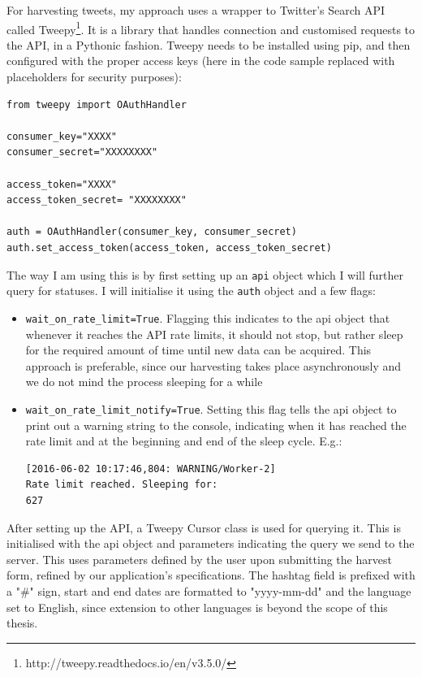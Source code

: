 \documentclass[12pt,a4paper,twoside]{report}
\begin{document}
For harvesting tweets, my approach uses a wrapper to Twitter's Search API called Tweepy\footnote{http://tweepy.readthedocs.io/en/v3.5.0/}. It is a library that handles connection and customised requests to the API, in a Pythonic fashion. Tweepy needs to be installed using pip, and then configured with the proper access keys (here in the code sample replaced with placeholders for security purposes):

\lstset{basicstyle=\small}
\begin{lstlisting}
from tweepy import OAuthHandler

consumer_key="XXXX"
consumer_secret="XXXXXXXX"

access_token="XXXX"
access_token_secret= "XXXXXXXX"

auth = OAuthHandler(consumer_key, consumer_secret)
auth.set_access_token(access_token, access_token_secret)
\end{lstlisting}

The way I am using this is by first setting up an \texttt{api} object which I will further query for statuses. I will initialise it using the \texttt{auth} object and a few flags:

\begin{itemize}
\item \texttt{wait\_on\_rate\_limit=True}. Flagging this indicates to the api object that whenever it reaches the API rate limits, it should not stop, but rather sleep for the required amount of time until new data can be acquired. This approach is preferable, since our harvesting takes place asynchronously and we do not mind the process sleeping for a while
\item \texttt{wait\_on\_rate\_limit\_notify=True}. Setting this flag tells the api object to print out a warning string to the console, indicating when it has reached the rate limit and at the beginning and end of the sleep cycle. E.g.:\lstset{basicstyle=\small}
\begin{lstlisting}
[2016-06-02 10:17:46,804: WARNING/Worker-2]
Rate limit reached. Sleeping for:
627
\end{lstlisting}
\end{itemize}

After setting up the API, a Tweepy Cursor class is used for querying it. This is initialised with the api object and parameters indicating the query we send to the server. This uses parameters defined by the user upon submitting the harvest form, refined by our application's specifications. The hashtag field is prefixed with a "\#" sign, start and end dates are formatted to "yyyy-mm-dd" and the language set to English, since extension to other languages is beyond the scope of this thesis.
\end{document}
